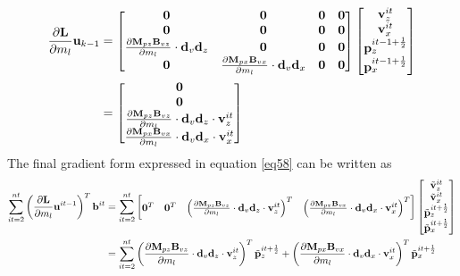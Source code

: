 \documentclass[revised,endfloat]{geophysics}
\begin{document}
\begin{equation}
\begin{split}
\frac{\partial {\bf L}}{\partial m_l} {\bf u}_{k-1} &=  
\begin{bmatrix}
\bf{0}   & \bf{0}   & \bf{0} & \bf{0}   \\
\bf{0}   & \bf{0}   & \bf{0} & \bf{0}   \\
\frac{{\partial \bf M}_{pz}{\bf B}_{vz}}{\partial m_l} \cdot {\bf d}_v{\bf d}_z & \bf{0} & {\bf 0} & \bf{0}   \\ 
\bf{0} & \frac{{\partial \bf M}_{px}{\bf B}_{vx}}{\partial m_l} \cdot {\bf d}_v{\bf d}_x & \bf{0} & {\bf 0} \\ 
\end{bmatrix}
\begin{bmatrix}
{\bf v}_z^{it} \\
{\bf v}_x^{it} \\
{\bf p}_z^{it-1+\frac{1}{2}} \\
{\bf p}_x^{it-1+\frac{1}{2}} \\
\end{bmatrix} \\
&=
\begin{bmatrix}
{\bf 0} \\
{\bf 0} \\
\frac{{\partial \bf M}_{pz}{\bf B}_{vz}}{\partial m_l} \cdot {\bf d}_v{\bf d}_z \cdot {\bf v}_z^{it} \\
\frac{{\partial \bf M}_{px}{\bf B}_{vx}}{\partial m_l} \cdot {\bf d}_v{\bf d}_x \cdot {\bf v}_x^{it} \\
\end{bmatrix} 
\end{split}
\label{eq70}  
\end{equation}
The final gradient form expressed in equation \ref{eq58} can be written as
\begin{equation}
\begin{split}
 \sum_{it=2}^{nt} \left( {\frac{\partial {\bf L}}{\partial m_l} {\bf u}^{it-1}} \right)^T {\bf b}^{it}  &=
\sum_{it=2}^{nt} \begin{bmatrix} 
 {\bf 0}^T & {\bf 0}^T & \left( \frac{{\partial \bf M}_{pz}{\bf B}_{vz}}{\partial m_l} \cdot {\bf d}_v{\bf d}_z \cdot {\bf v}_z^{it} \right)^T & \left( \frac{{\partial \bf M}_{px}{\bf B}_{vx}}{\partial m_l} \cdot {\bf d}_v{\bf d}_x \cdot {\bf v}_x^{it} \right)^T
\end{bmatrix} 
\begin{bmatrix}
\tilde{{\bf v}}_z^{it} \\
\tilde{{\bf v}}_x^{it} \\
\tilde{{\bf p}}_z^{it+\frac{1}{2}} \\
\tilde{{\bf p}}_x^{it+\frac{1}{2}} \\
\end{bmatrix} \\
&=  \sum_{it=2}^{nt} \left( \frac{{\partial \bf M}_{pz}{\bf B}_{vz}}{\partial m_l} \cdot {\bf d}_v{\bf d}_z \cdot {\bf v}_z^{it} \right)^T \tilde{{\bf p}}_z^{it+\frac{1}{2}} +  \left( \frac{{\partial \bf M}_{px}{\bf B}_{vx}}{\partial m_l} \cdot {\bf d}_v{\bf d}_x \cdot {\bf v}_x^{it} \right)^T \tilde{{\bf p}}_x^{it+\frac{1}{2}} 
\end{split}
\label{eq71}
 \end{equation}
\end{document}
